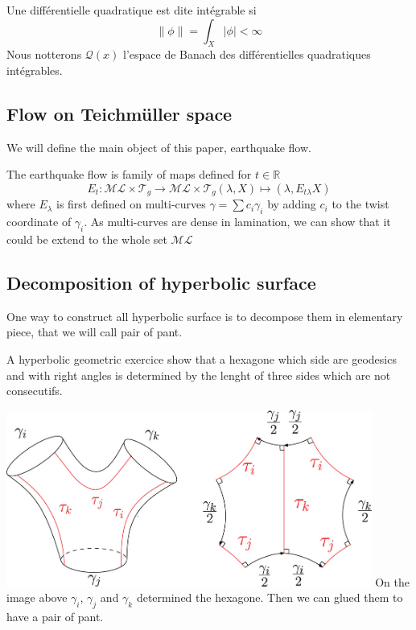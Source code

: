 Une différentielle quadratique est dite intégrable si \[
 \| \phi \| = \int_X | \phi | < \infty
\]
Nous notterons $\mathcal{Q}(x)$ l'espace de Banach des différentielles quadratiques intégrables.

\subsection{Flow on Teichmüller space}

We will define the main object of this paper, earthquake flow.
\begin{dfnt}
The earthquake flow is family of maps defined for $t \in \mathbb{R}$
\[
E_t: \mathcal{ML}\times \mathcal{T}_g \to \mathcal{ML}\times \mathcal{T}_g
(\lambda,X) \mapsto (\lambda,E_{t\lambda}X)
\]
where $E_\lambda$ is first defined on multi-curves $\gamma =\sum c_i \gamma_i$ by adding $c_i$ to the twist coordinate of $\gamma_i$.
As multi-curves are dense in lamination, we can show that it could be extend to the whole set $\mathcal{ML}$
\end{dfnt}


\subsection{Decomposition of hyperbolic surface}

One way to construct all hyperbolic surface is to decompose them in elementary piece, that we will call pair of pant.

A hyperbolic geometric exercice show that a hexagone which side are geodesics and with right angles is determined by the lenght of three sides which are not consecutifs.

\includegraphics[width=12cm]{Image/PairOfPant.jpg}
 On the image above $\gamma_i$, $\gamma_j$ and $\gamma_k$ determined the hexagone. Then we can glued them to have a pair of pant.

